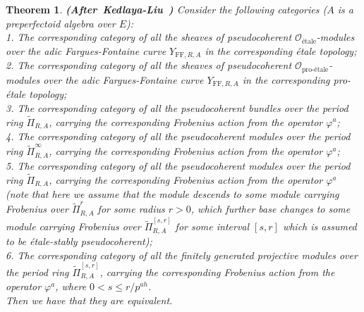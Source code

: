 \documentclass[12pt]{amsart}
\newtheorem{theorem}{Theorem}[section]
\theoremstyle{definition}
\numberwithin{equation}{section}
\begin{document}
\begin{theorem} \mbox{\bf{(After Kedlaya-Liu \cite[Theorem 4.6.1]{KL2})}}  
Consider the following categories ($A$ is a preperfectoid algebra over $E$):\\
1. The corresponding category of all the sheaves of pseudocoherent $\mathcal{O}_{\text{\'etale}}$-modules over the adic Fargues-Fontaine curve $Y_{\mathrm{FF},R,A}$ in the corresponding \'etale topology;\\
2. The corresponding category of all the sheaves of pseudocoherent $\mathcal{O}_{\text{pro-\'etale}}$-modules over the adic Fargues-Fontaine curve $Y_{\mathrm{FF},R,A}$ in the corresponding pro-\'etale topology;\\
3. The corresponding category of all the pseudocoherent bundles over the period ring $\widetilde{\Pi}_{R,A}$, carrying the corresponding Frobenius action from the operator $\varphi^a$;\\
4. The corresponding category of all the pseudocoherent modules over the period ring $\widetilde{\Pi}^{\infty}_{R,A}$, carrying the corresponding Frobenius action from the operator $\varphi^a$;\\
5. The corresponding category of all the pseudocoherent modules over the period ring $\widetilde{\Pi}^{}_{R,A}$, carrying the corresponding Frobenius action from the operator $\varphi^a$ (note that here we assume that the module descends to some module carrying Frobenius over $\widetilde{\Pi}^{r}_{R,A}$ for some radius $r>0$, which further base changes to some module carrying Frobenius over $\widetilde{\Pi}^{[s,r]}_{R,A}$ for some interval $[s,r]$ which is assumed to be \'etale-stably pseudocoherent);\\
6. The corresponding category of all the finitely generated projective modules over the period ring $\widetilde{\Pi}^{[s,r]}_{R,A}$, carrying the corresponding Frobenius action from the operator $\varphi^a$, where $0<s\leq r/p^{ah}$.\\
Then we have that they are equivalent.
\end{theorem}
\end{document}
